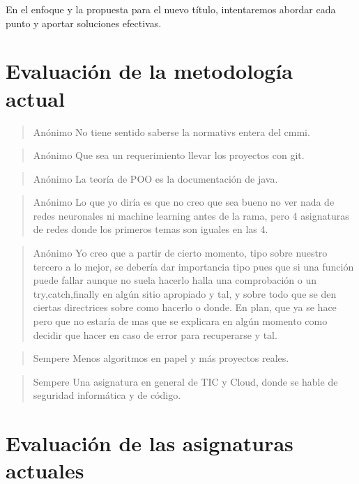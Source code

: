 En el enfoque y la propuesta para el nuevo título,
intentaremos abordar cada punto y aportar soluciones efectivas.

\section{Evaluación de la metodología actual}

\begin{quote}{Anónimo}
    No tiene sentido saberse la normativs entera del cmmi.
\end{quote}

\begin{quote}{Anónimo}
    Que sea un requerimiento llevar los proyectos con git.
\end{quote}

\begin{quote}{Anónimo}
    La teoría de POO es la documentación de java.
\end{quote}

\begin{quote}{Anónimo}
    Lo que yo diría es que no creo que sea bueno
    no ver nada de redes neuronales ni machine learning antes de la rama,
    pero 4 asignaturas de redes donde los primeros temas son iguales en las 4.
\end{quote}

\begin{quote}{Anónimo}
    Yo creo que a partir de cierto momento,
    tipo sobre nuestro tercero a lo mejor,
    se debería dar importancia tipo pues que
    si una función puede fallar aunque no suela hacerlo
    halla una comprobación o un try,catch,finally en algún sitio apropiado y tal,
    y sobre todo que se den ciertas directrices sobre como hacerlo o donde.
    En plan, que ya se hace pero que no estaría de mas que
    se explicara en algún momento como decidir que hacer en caso de error
    para recuperarse y tal.
\end{quote}

\begin{quote}{Sempere}
    Menos algoritmos en papel y más proyectos reales.
\end{quote}

\begin{quote}{Sempere}
    Una asignatura en general de TIC y Cloud,
    donde se hable de seguridad informática y de código.
\end{quote}

\section{Evaluación de las asignaturas actuales}

